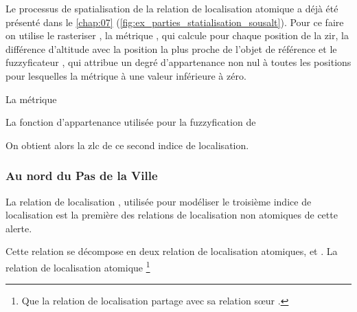 Le processus de spatialisation de la relation de localisation atomique
 a déjà été présenté dans le
\autoref{chap:07}
(\autoref{fig:ex_parties_statialisation_sousalt}). Pour ce faire on
utilise le rasteriser , la métrique
, qui calcule pour chaque position de
la \ac{zir}, la différence d'altitude avec la position la plus proche
de l'objet de référence et le fuzzyficateur ,
qui attribue un degré d'appartenance non nul à toutes les positions
pour lesquelles la métrique à une valeur inférieure à zéro.

La métrique

%   


La fonction d'appartenance utilisée pour la fuzzyfication de  

%   

On obtient alors la \ac{zlc} de ce second indice de localisation.

%   

\subsubsection{Au nord du Pas de la Ville}

La relation de localisation ,
utilisée pour modéliser le troisième indice de localisation est la
première des relations de localisation non atomiques de cette alerte.

% 
Cette relation se décompose en deux relation de localisation
atomiques,  et
. La relation de localisation
atomique  \footnote{Que la relation de
  localisation \protect{} partage avec
  sa relation sœur \protect{}.}

